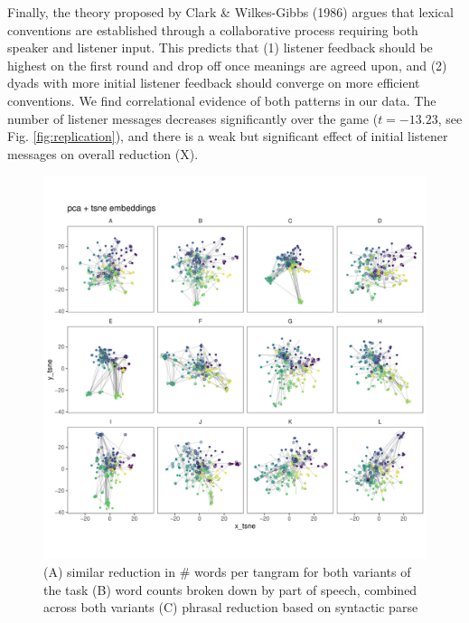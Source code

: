 \documentclass[alpha-refs]{wiley-article}
\begin{document}
Finally, the theory proposed by Clark \& Wilkes-Gibbs (1986) argues that
lexical conventions are established through a collaborative process
requiring both speaker and listener input. This predicts that (1)
listener feedback should be highest on the first round and drop off once
meanings are agreed upon, and (2) dyads with more initial listener
feedback should converge on more efficient conventions. We find
correlational evidence of both patterns in our data. The number of
listener messages decreases significantly over the game (\(t = -13.23\),
see Fig. \ref{fig:replication}), and there is a weak but significant
effect of initial listener messages on overall reduction (X).

\begin{figure}[t]
\centering
\includegraphics[scale=.3]{tsne_embeddings.pdf}
\caption{(A) similar reduction in \# words per tangram for both variants of the task (B) word counts broken down by part of speech, combined across both variants (C) phrasal reduction based on syntactic parse }
\label{fig:reduction}
\end{figure}
\end{document}
